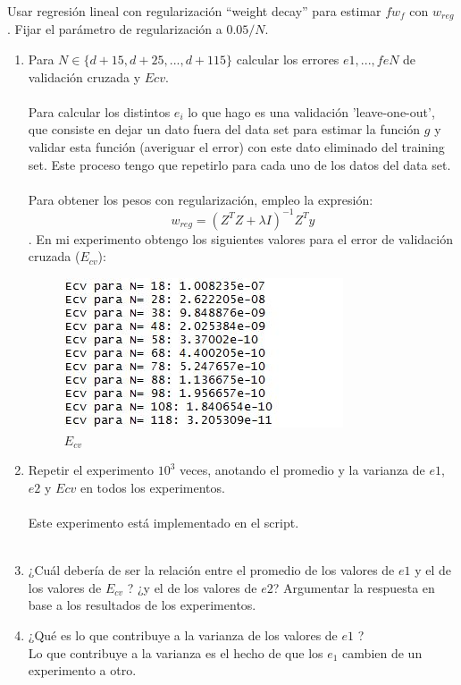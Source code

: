 	 Usar regresión lineal con regularización ``weight decay'' para estimar $fw_f$ con $w_{reg}$. Fijar el parámetro de regularización a $0.05/N$.
	 \begin{enumerate}
	 	\item Para $N\in\{d+15,d+25,...,d+115\}$ calcular los errores $e{1},...,fe{N}$ de validación cruzada y $Ecv$.
	 	\\
	 	\\
	 	
	 	Para calcular los distintos $e_i$ lo que hago es una validación 'leave-one-out', que consiste en dejar un dato fuera del data set para estimar la función $g$ y validar esta función (averiguar el error) con este dato eliminado del training set. Este proceso tengo que repetirlo para cada uno de los datos del data set.
	 	\\
	 	\\
	 	
	 	Para obtener los pesos con regularización, empleo la expresión: 
	 	$$w_{reg} = (Z^TZ + \lambda I)^{-1}Z^Ty$$. En mi experimento obtengo los siguientes valores para el error de validación cruzada ($E_{cv}$):
	 	\begin{figure} [H]
		\centering
		\includegraphics[width=0.7\linewidth]{captura13}
		\caption{$E_{cv}$}
		\label{fig:captura13}
		\end{figure}

	 	\item Repetir el experimento $10^3$ veces, anotando el promedio y la varianza de $e{1}$, $e{2}$ y $Ecv$ en todos los experimentos.
	 	\\
	 	\\
	 	
	 	Este experimento está implementado en el script.
	 	\\
	 	\\
	 	
    \item ¿Cuál debería de ser la relación entre el promedio de los valores de $e{1}$ y el de los valores de $E_{cv}$ ? ¿y el de los valores de $e{2}$? Argumentar la respuesta en base a los resultados de los experimentos.
    \item ¿Qué es lo que contribuye a la varianza de los valores de $e{1}$ ? \\
    Lo que contribuye a la varianza es el hecho de que los $e_1$ cambien de un experimento a otro.
	 \end{enumerate}
	 
